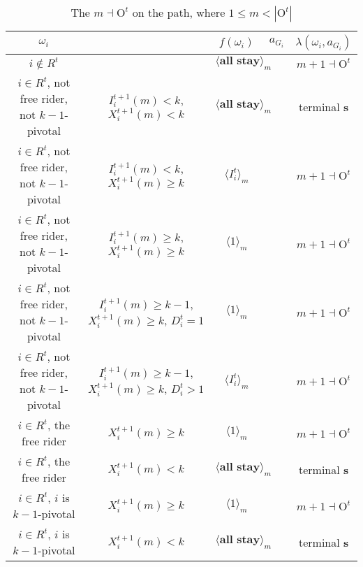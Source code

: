 \documentclass[12pt,letter]{article}
\newcommand{\Omicron}{\mathrm{O}}
\theoremstyle{definition}
\theoremstyle{remark}
\theoremstyle{claim}
\begin{document}
\begin{landscape}
\begin{table}[!htbp]
\caption{The $m\dashv\Omicron^t$ on the path, where $1\leq m < |\Omicron^t|$}
\label{table:eqm_path_ot1}
\begin{center}
\begin{tabular}{c c | c | c | c}
$\omega_i$ 	 & 	   &	$f(\omega_i)$  &	$a_{G_i}$ & $\lambda(\omega_i,a_{G_i})$ \\
\hline
\hline
$i\notin R^t$  	& 								& $\langle \textbf{all stay} \rangle_m$		&  			& $m+1\dashv \Omicron^t$ \\
$i\in R^t$, not free rider, not $k-1$-pivotal		 	&  $I^{t+1}_i(m)< k$, $X^{t+1}_i(m)<k$			&  $\langle \textbf{all stay} \rangle_m$	& 	& terminal \textbf{s} \\
$i\in R^t$, not free rider, not $k-1$-pivotal	  	& $I^{t+1}_i(m)<k$, $X^{t+1}_i(m)\geq k$		    & $\langle I^t_i \rangle_m$ 		&    			& $m+1\dashv \Omicron^t$ \\
$i\in R^t$, not free rider, not $k-1$-pivotal	 	&  $I^{t+1}_i(m)\geq k$, $X^{t+1}_i(m)\geq k$	& $\langle 1 \rangle_m$ 	& 	& $m+1\dashv \Omicron^t$ \\
$i\in R^t$, not free rider, not $k-1$-pivotal	 	&  $I^{t+1}_i(m)\geq k-1$, $X^{t+1}_i(m)\geq k$, $D^t_i=1$	& $\langle 1 \rangle_m$ 	& 	& $m+1\dashv \Omicron^t$ \\
$i\in R^t$, not free rider, not $k-1$-pivotal	 	&  $I^{t+1}_i(m)\geq k-1$, $X^{t+1}_i(m)\geq k$, $D^t_i>1$	& $\langle I^t_i \rangle_m$ 	& 	& $m+1\dashv \Omicron^t$ \\
$i\in R^t$, the free rider  	&  $X^{t+1}_i(m)\geq k$ & $\langle 1 \rangle_m$ 		& 				  & $m+1\dashv \Omicron^t$ \\
$i\in R^t$, the free rider  	&  		$X^{t+1}_i(m)<k$					&  $\langle \textbf{all stay} \rangle_m$		& 										  & terminal \textbf{s} \\
$i\in R^t$, $i$ is $k-1$-pivotal  	&  $X^{t+1}_i(m)\geq k$ & $\langle 1 \rangle_m$ 	& 											 & $m+1\dashv \Omicron^t$ \\
$i\in R^t$, $i$ is $k-1$-pivotal  	&  	$X^{t+1}_i(m)<k$		&  $\langle \textbf{all stay} \rangle_m$	& 											 & terminal \textbf{s} \\
\hline

\end{tabular}
\end{center}
\end{table}
\end{landscape}
\end{document}
